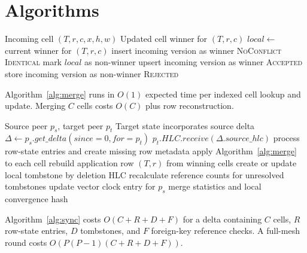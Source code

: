 \documentclass[pdflatex,sn-mathphys-num]{sn-jnl}
\begin{document}
\section{Algorithms}

\begin{algorithm}[t]
\caption{Cell-Level CRDT Merge Procedure}
\label{alg:merge}
\begin{algorithmic}[1]
\Require Incoming cell $(T,r,c,x,h,w)$
\Ensure Updated cell winner for $(T,r,c)$
\State $local \gets$ current winner for $(T,r,c)$
  \State insert incoming version as winner
  \State \Return \textsc{NoConflict}
\EndIf
{}
  \State \Return \textsc{Identical}
\EndIf
{}
  \State mark $local$ as non-winner
  \State upsert incoming version as winner
  \State \Return \textsc{Accepted}
\Else
  \State store incoming version as non-winner
  \State \Return \textsc{Rejected}
\EndIf
\end{algorithmic}
\end{algorithm}

Algorithm~\ref{alg:merge} runs in $O(1)$ expected time per indexed cell lookup and update. Merging $C$ cells costs $O(C)$ plus row reconstruction.

\begin{algorithm}[t]
\caption{Peer-to-Peer Synchronization Protocol}
\label{alg:sync}
\begin{algorithmic}[1]
\Require Source peer $p_s$, target peer $p_t$
\Ensure Target state incorporates source delta
\State $\Delta \gets p_s.get\_delta(since=0,for=p_t)$
\State $p_t.HLC.receive(\Delta.source\_hlc)$
\State process row-state entries and create missing row metadata
  \State apply Algorithm~\ref{alg:merge} to each cell
  \State rebuild application row $(T,r)$ from winning cells
\EndFor
{}
  \State create or update local tombstone by deletion HLC
\EndFor
\State recalculate reference counts for unresolved tombstones
\State update vector clock entry for $p_s$
\State \Return merge statistics and local convergence hash
\end{algorithmic}
\end{algorithm}

Algorithm~\ref{alg:sync} costs $O(C+R+D+F)$ for a delta containing $C$ cells, $R$ row-state entries, $D$ tombstones, and $F$ foreign-key reference checks. A full-mesh round costs $O(P(P-1)(C+R+D+F))$.
\end{document}
